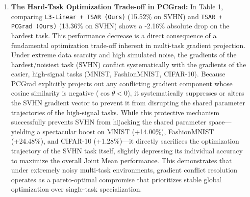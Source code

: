 \begin{enumerate}
    While this represents a minor mathematical approximation, we find it is exceptionally stable and harmless in practice because: (i) the pre-trained task representations are highly clustered and well-separated on the unit sphere, meaning the centered norms are highly concentrated around a tight mean magnitude, and (ii) any residual localized scaling perturbation is absorbed as a minor scaling adjustment by the downstream routing weights $W_{l,k}$ during gradient-based calibration. For applications where maximum mathematical precision is required, practitioners can easily replace our uncentered projection with a centered Singular Value Decomposition (SVD) projection scheme (explicitly subtracting $\mu_z$ before applying $P$ and normalizing), though this requires storing and subtracting the $D$-dimensional global calibration mean during real-time edge serving. Our uncentered approach acts as a computationally streamlined, zero-overhead deployment alternative that delivers outstanding routing stability.

    \item \textbf{The Hard-Task Optimization Trade-off in PCGrad:}
    In Table 1, comparing \texttt{L3-Linear + TSAR (Ours)} (15.52\% on SVHN) and \texttt{TSAR + PCGrad (Ours)} (13.36\% on SVHN) shows a -2.16\% absolute drop on the hardest task. This performance decrease is a direct consequence of a fundamental optimization trade-off inherent in multi-task gradient projection. Under extreme data scarcity and high simulated noise, the gradients of the hardest/noisiest task (SVHN) conflict systematically with the gradients of the easier, high-signal tasks (MNIST, FashionMNIST, CIFAR-10). Because PCGrad explicitly projects out any conflicting gradient component whose cosine similarity is negative ($\cos\theta < 0$), it systematically suppresses or alters the SVHN gradient vector to prevent it from disrupting the shared parameter trajectories of the high-signal tasks. While this protective mechanism successfully prevents SVHN from hijacking the shared parameter space---yielding a spectacular boost on MNIST (+14.00\%), FashionMNIST (+24.48\%), and CIFAR-10 (+1.28\%)---it directly sacrifices the optimization trajectory of the SVHN task itself, slightly depressing its individual accuracy to maximize the overall Joint Mean performance. This demonstrates that under extremely noisy multi-task environments, gradient conflict resolution operates as a pareto-optimal compromise that prioritizes stable global optimization over single-task specialization.


\end{enumerate}
